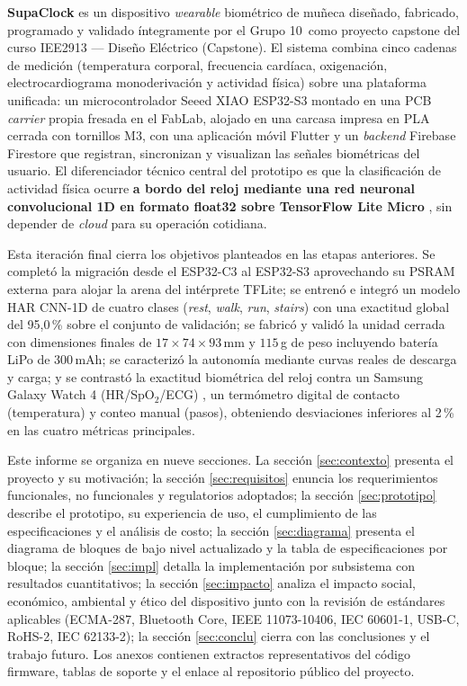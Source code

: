 \documentclass[letterpaper,11pt]{article}
\newcommand{\Curso}{IEE2913 --- Dise\~no El\'ectrico (Capstone)}
\newcommand{\NumeroGrupo}{10}
\newcommand{\NombreProyecto}{SupaClock}
\begin{document}
\textbf{\NombreProyecto} es un dispositivo \textit{wearable} biom\'etrico de mu\~neca dise\~nado, fabricado, programado y validado \'integramente por el Grupo \NumeroGrupo\ como proyecto capstone del curso \Curso. El sistema combina cinco cadenas de medici\'on (temperatura corporal, frecuencia card\'iaca, oxigenaci\'on, electrocardiograma monoderivaci\'on y actividad f\'isica) sobre una plataforma unificada: un microcontrolador Seeed XIAO ESP32-S3 \cite{esp32s3_ds_2024,xiao_esp32s3_pinout} montado en una PCB \textit{carrier} propia fresada en el FabLab, alojado en una carcasa impresa en PLA cerrada con tornillos M3, con una aplicaci\'on m\'ovil Flutter \cite{flutter,flutterbluepl} y un \textit{backend} Firebase Firestore \cite{firebase_docs} que registran, sincronizan y visualizan las se\~nales biom\'etricas del usuario. El diferenciador t\'ecnico central del prototipo es que la clasificaci\'on de actividad f\'isica ocurre \textbf{a bordo del reloj mediante una red neuronal convolucional 1D en formato float32 sobre TensorFlow Lite Micro} \cite{tflite_micro,david2021tflitemicro}, sin depender de \textit{cloud} para su operaci\'on cotidiana.

Esta iteraci\'on final cierra los objetivos planteados en las etapas anteriores. Se complet\'o la migraci\'on desde el ESP32-C3 al ESP32-S3 aprovechando su PSRAM externa para alojar la arena del int\'erprete TFLite; se entren\'o e integr\'o un modelo HAR CNN-1D de cuatro clases (\textit{rest}, \textit{walk}, \textit{run}, \textit{stairs}) con una exactitud global del 95{,}0\,\% sobre el conjunto de validaci\'on; se fabric\'o y valid\'o la unidad cerrada con dimensiones finales de $17 \times 74 \times 93$\,mm y $115$\,g de peso incluyendo bater\'ia LiPo de $300$\,mAh; se caracteriz\'o la autonom\'ia mediante curvas reales de descarga y carga; y se contrast\'o la exactitud biom\'etrica del reloj contra un Samsung Galaxy Watch 4 (HR/SpO$_2$/ECG) \cite{galaxy_watch4}, un term\'ometro digital de contacto (temperatura) y conteo manual (pasos), obteniendo desviaciones inferiores al 2\,\% en las cuatro m\'etricas principales.

Este informe se organiza en nueve secciones. La secci\'on \ref{sec:contexto} presenta el proyecto y su motivaci\'on; la secci\'on \ref{sec:requisitos} enuncia los requerimientos funcionales, no funcionales y regulatorios adoptados; la secci\'on \ref{sec:prototipo} describe el prototipo, su experiencia de uso, el cumplimiento de las especificaciones y el an\'alisis de costo; la secci\'on \ref{sec:diagrama} presenta el diagrama de bloques de bajo nivel actualizado y la tabla de especificaciones por bloque; la secci\'on \ref{sec:impl} detalla la implementaci\'on por subsistema con resultados cuantitativos; la secci\'on \ref{sec:impacto} analiza el impacto social, econ\'omico, ambiental y \'etico del dispositivo junto con la revisi\'on de est\'andares aplicables (ECMA-287, Bluetooth Core, IEEE 11073-10406, IEC 60601-1, USB-C, RoHS-2, IEC 62133-2); la secci\'on \ref{sec:conclu} cierra con las conclusiones y el trabajo futuro. Los anexos contienen extractos representativos del c\'odigo firmware, tablas de soporte y el enlace al repositorio p\'ublico del proyecto.
\end{document}
